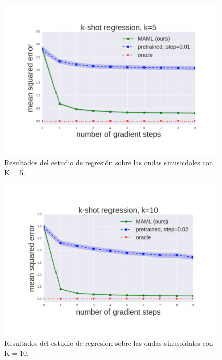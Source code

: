 \begin{figure}[H]
\begin{center}
 \includegraphics[width=0.8\linewidth]{Figuras/MAML/sinusoid_1.pdf}
\end{center}
\caption{Resultados del estudio de regresión sobre las ondas sinusoidales con K = 5.}
 \label{fig:sinusoid_results_1}
\end{figure}

\begin{figure}[H]
\begin{center}
 \includegraphics[width=0.8\linewidth]{Figuras/MAML/sinusoid_2.pdf}
\end{center}
\caption{Resultados del estudio de regresión sobre las ondas sinusoidales con K = 10.}
 \label{fig:sinusoid_results_2}
\end{figure}

